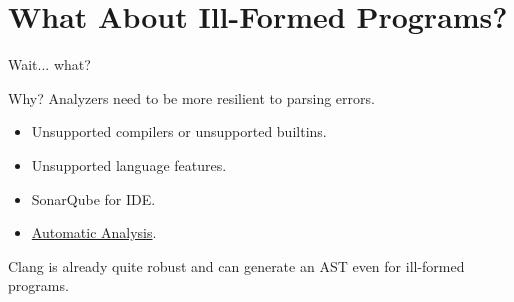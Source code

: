 \documentclass[aspectratio=169]{beamer}
\begin{document}
\section*{What About Ill-Formed Programs?}
\begin{frame}{Wait... what?}
  \begin{block}{Why?}
    Analyzers need to be more resilient to parsing errors.
    \begin{itemize}
      \item Unsupported compilers or unsupported builtins.
      \item Unsupported language features.
      \item SonarQube for IDE.
      \item \href{https://docs.sonarsource.com/sonarqube-cloud/advanced-setup/automatic-analysis}{Automatic Analysis}.
    \end{itemize}
  \end{block}
  Clang is already quite robust and can generate an AST even for ill-formed programs.
\end{frame}
\end{document}

